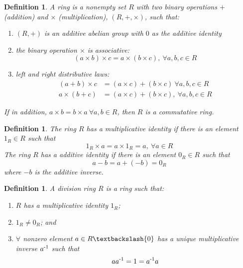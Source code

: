 \documentclass[a4paper,8pt]{article}
\newcommand{\hlt}[1]{\textit{{\color{blue}#1}}}
\theoremstyle{theorem}
\newtheorem{definition}[theorem]{Definition}
\begin{document}
\begin{definition}
A \hlt{ring} is a nonempty set $ R $ with two binary operations $ + $ (addition) and $ \times $ (multiplication), $ (R, +, \times) $, such that:
\begin{enumerate}[label=(\roman*)]
\item $(R, +)$ is an additive abelian group with $0$ as the additive identity
\item the binary operation $\times$ is associative: 
\begin{equation}
(a \times b) \times c = a \times (b \times c), \ \forall a, b, c \in R
\nonumber
\end{equation}
\item left and right distributive laws: 
\begin{align}
(a+b) \times c &= (a \times c) + (b \times c) \ \forall a, b, c \in R \nonumber \\
a \times (b+c) &= (a \times c) + (b \times c), \ \forall a, b, c \in R \nonumber
\end{align}
\end{enumerate}
If in addition, $a \times b = b \times a \ \forall a, b \in R$, then $R$ is a \hlt{commutative ring}.
\end{definition}


\begin{definition}
The ring $R$ has a \hlt{multiplicative identity} if there is an element $1_R \in R$ such that 
\begin{equation}
1_R \times a = a \times 1_R = a, \ \forall a \in R
\nonumber
\end{equation}
The ring $R$ has a \hlt{additive identity} if there is an element $0_R \in R$ such that 
\begin{equation}
a-b = a+(-b) = 0_R
\nonumber
\end{equation}
where $-b$ is the \hlt{additive inverse}.\\
\end{definition}


\begin{definition}
A \hlt{division ring} $R$ is a ring such that:
\begin{enumerate}[label=(\roman*)]
\item $R$ has a multiplicative identity $1_R$;
\item $1_R \neq 0_R$; and
\item $\forall$ nonzero element $a \in R \textbackslash \{0\}$ has a unique multiplicative inverse $a \textsuperscript{-1}$ such that
\begin{equation}
aa \textsuperscript{-1} = 1 = a \textsuperscript{-1} a
\nonumber
\end{equation}
\end{enumerate}
\end{definition}
\end{document}

